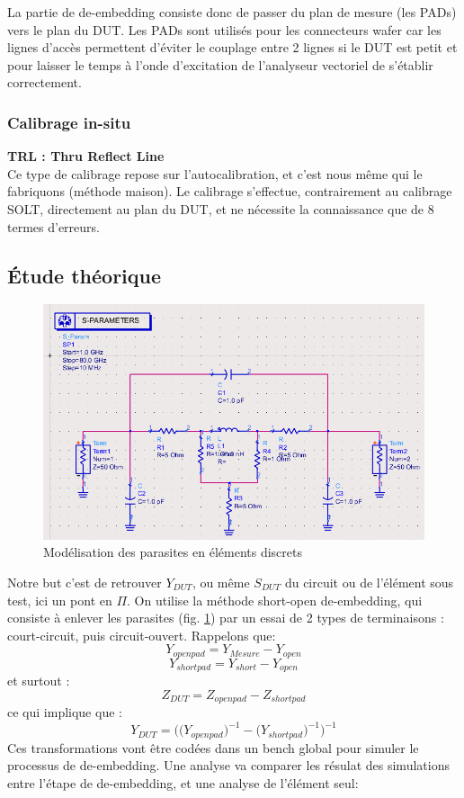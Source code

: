 \documentclass[a4paper]{article}
\begin{document}
La partie de de-embedding consiste donc de passer du plan de mesure (les PADs) vers le plan du DUT.
Les PADs sont utilis\'es pour les connecteurs wafer car les lignes d'acc\`es permettent d'\'eviter le couplage
entre 2 lignes si le DUT est petit et pour laisser le temps \`a l'onde d'excitation de l'analyseur vectoriel
de s'\'etablir correctement.

\subsubsection{Calibrage in-situ}
\textbf{TRL : Thru Reflect Line } \\
Ce type de calibrage repose sur l'autocalibration, et c'est nous m\^eme qui le fabriquons (m\'ethode maison).
Le calibrage s'effectue, contrairement au calibrage SOLT, directement au plan du DUT, et ne n\'ecessite la connaissance
que de 8 termes d'erreurs.

\subsection{\'Etude th\'eorique}

\begin{figure}[!htb]
\begin{center}
  \includegraphics[scale=0.45]{de-embedding_scheme.png}
  \caption{Mod\'elisation des parasites en \'el\'ements discrets }
  \label{de-embedding-scheme}
\end{center}
\end{figure}

Notre but c'est de retrouver $Y_{DUT}$, ou m\^eme $S_{DUT}$ du circuit ou de l'\'el\'ement sous test, ici un pont en $\Pi$.
On utilise la m\'ethode short-open de-embedding, qui consiste \`a enlever les parasites (fig. \ref{de-embedding-scheme}) par un essai de 2 types de terminaisons :
court-circuit, puis circuit-ouvert. Rappelons que\cite{sim-elec-cours}:
\[
Y_{openpad} = Y_{Mesure} - Y_{open}
\]
 \clearpage
 \[
Y_{shortpad} = Y_{short} - Y_{open}
\]
et surtout :
\[
Z_{DUT} = Z_{openpad} - Z_{shortpad}
\]
ce qui implique que :
\[
Y_{DUT} = \bigg( \big( Y_{openpad} \big)^{-1} - \big( Y_{shortpad} \big)^{-1} \bigg)^{-1}
\]
Ces transformations vont \^etre cod\'ees dans un bench global pour simuler le processus de de-embedding. Une analyse va comparer
les r\'esulat des simulations entre l'\'etape de de-embedding, et une analyse de l'\'el\'ement seul:
\end{document}
